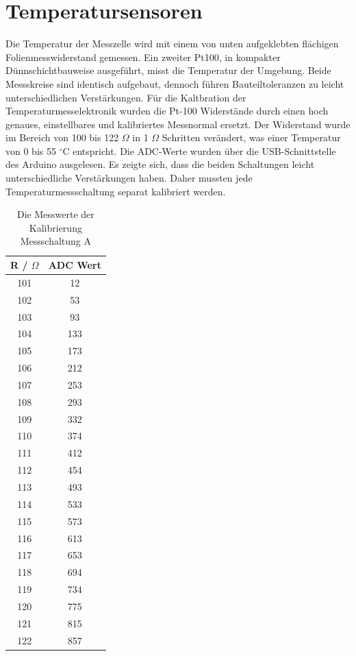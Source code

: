 \documentclass[a4paper,bibtotoc,oneside]{scrbook}
\begin{document}
\section{Temperatursensoren}\thispagestyle{empty}
Die Temperatur der Messzelle wird mit einem von unten aufgeklebten flächigen Folienmesswiderstand gemessen. 
Ein zweiter Pt100, in kompakter Dünnschichtbauweise ausgeführt, misst die Temperatur der Umgebung. Beide Messskreise sind identisch aufgebaut, dennoch führen Bauteiltoleranzen zu leicht unterschiedlichen Verstärkungen.
Für die Kaltbration der Temperaturmesselektronik wurden die Pt-100 Widerstände durch einen hoch genaues, einstellbares und kalibriertes Messnormal ersetzt. Der Widerstand wurde im Bereich von 100 bis 122 	$\Omega$  in 1 $\Omega$  Schritten verändert, was einer Temperatur von 0 bis 55 $^{\circ}$C entspricht. Die ADC-Werte wurden über die USB-Schnittstelle des Arduino ausgelesen. Es zeigte sich, dass die beiden Schaltungen leicht unterschiedliche Verstärkungen haben. Daher mussten jede Temperaturmessschaltung separat kalibriert werden.

\begin{table}[htbp]
\centering
\begin{tabular}{ | c | c | }\hline
{\bf R / $\Omega$ } & {\bf ADC Wert}\\ \hline
\hline
101 & 12\\ \hline
102 & 53\\ \hline
103 & 93\\ \hline
104 & 133\\ \hline
105 & 173\\ \hline
106 & 212\\ \hline
107 & 253\\ \hline
108 & 293\\ \hline
109 & 332\\ \hline
110 & 374\\ \hline
111 & 412\\ \hline
112 & 454\\ \hline
113 & 493\\ \hline
114 & 533\\ \hline
115 & 573\\ \hline
116 & 613\\ \hline
117 & 653\\ \hline
118 & 694\\ \hline
119 & 734\\ \hline
120 & 775\\ \hline
121 & 815\\ \hline
122 & 857\\ \hline
\end{tabular}
\caption{Die Messwerte der Kalibrierung Messschaltung A}\label{TabA}
\end{table}
\end{document}
